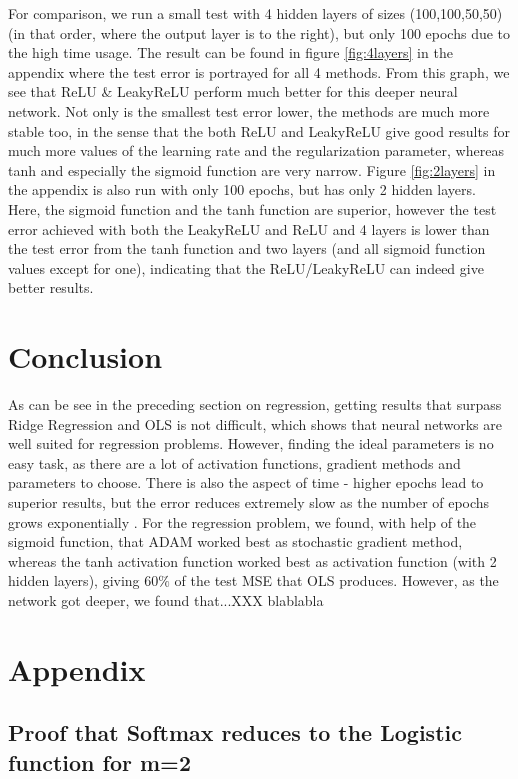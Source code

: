 \documentclass[11pt,a4paper,titlepage]{article}
\begin{document}
For comparison, we run a small test with 4 hidden layers of sizes (100,100,50,50) (in that order, where the output layer is to the right), but only 100 epochs due to the high time usage. The result can be found in figure \ref{fig:4layers} in the appendix where the test error is portrayed for all 4 methods. From this graph, we see that ReLU \& LeakyReLU perform much better for this deeper neural network. Not only is the smallest test error lower, the methods are much more stable too, in the sense that the both ReLU and LeakyReLU give good results for much more values of the learning rate and the regularization parameter, whereas tanh and especially the sigmoid function are very narrow. Figure \ref{fig:2layers} in the appendix is also run with only 100 epochs, but has only 2 hidden layers. Here, the sigmoid function and the tanh function are superior, however the test error achieved with both the LeakyReLU and ReLU and 4 layers is lower than the test error from the tanh function and two layers (and all sigmoid function values except for one), indicating that the ReLU/LeakyReLU can indeed give better results.
\section{Conclusion}
As can be see in the preceding section on regression, getting results that surpass Ridge Regression and OLS is not difficult, which shows that neural networks are well suited for regression problems. However, finding the ideal parameters is no easy task, as there are a lot of activation functions, gradient methods and parameters to choose. There is also the aspect of time - higher epochs lead to superior results, but the error reduces extremely slow as the number of epochs grows exponentially \citep{handsOnMachineLearning}. For the regression problem, we found, with help of the sigmoid function, that ADAM worked best as stochastic gradient method, whereas the tanh activation function worked best as activation function (with 2 hidden layers), giving $60\%$ of the test MSE that OLS produces. However, as the network got deeper, we found that...XXX blablabla
\section{Appendix}
\subsection{Proof that Softmax reduces to the Logistic function for m=2}\label{ProofSoftmaxToLogistic}
\end{document}
